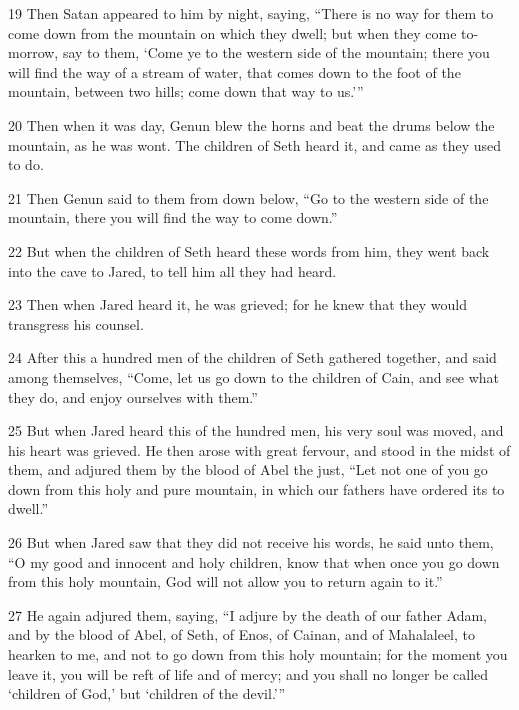 \par 19 Then Satan appeared to him by night, saying, “There is no way for them to come down from the mountain on which they dwell; but when they come to-morrow, say to them, ‘Come ye to the western side of the mountain; there you will find the way of a stream of water, that comes down to the foot of the mountain, between two hills; come down that way to us.’”

\par 20 Then when it was day, Genun blew the horns and beat the drums below the mountain, as he was wont. The children of Seth heard it, and came as they used to do.

\par 21 Then Genun said to them from down below, “Go to the western side of the mountain, there you will find the way to come down.”

\par 22 But when the children of Seth heard these words from him, they went back into the cave to Jared, to tell him all they had heard.

\par 23 Then when Jared heard it, he was grieved; for he knew that they would transgress his counsel.

\par 24 After this a hundred men of the children of Seth gathered together, and said among themselves, “Come, let us go down to the children of Cain, and see what they do, and enjoy ourselves with them.”

\par 25 But when Jared heard this of the hundred men, his very soul was moved, and his heart was grieved. He then arose with great fervour, and stood in the midst of them, and adjured them by the blood of Abel the just, “Let not one of you go down from this holy and pure mountain, in which our fathers have ordered its to dwell.”

\par 26 But when Jared saw that they did not receive his words, he said unto them, “O my good and innocent and holy children, know that when once you go down from this holy mountain, God will not allow you to return again to it.”

\par 27 He again adjured them, saying, “I adjure by the death of our father Adam, and by the blood of Abel, of Seth, of Enos, of Cainan, and of Mahalaleel, to hearken to me, and not to go down from this holy mountain; for the moment you leave it, you will be reft of life and of mercy; and you shall no longer be called ‘children of God,’ but ‘children of the devil.’”

